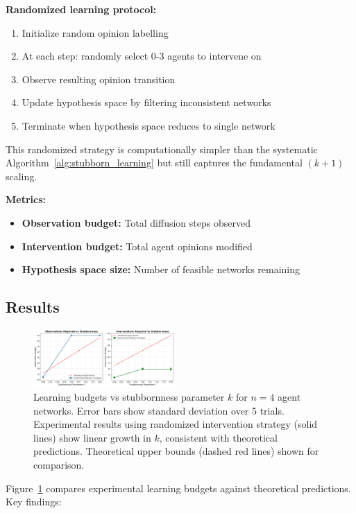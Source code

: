 \documentclass[conference]{IEEEtran}
\begin{document}
\textbf{Randomized learning protocol:} 
\begin{enumerate}
\item Initialize random opinion labelling
\item At each step: randomly select 0-3 agents to intervene on
\item Observe resulting opinion transition
\item Update hypothesis space by filtering inconsistent networks
\item Terminate when hypothesis space reduces to single network
\end{enumerate}

This randomized strategy is computationally simpler than the systematic Algorithm~\ref{alg:stubborn_learning} but still captures the fundamental $(k+1)$ scaling.

\textbf{Metrics:}
\begin{itemize}
\item \textbf{Observation budget:} Total diffusion steps observed
\item \textbf{Intervention budget:} Total agent opinions modified
\item \textbf{Hypothesis space size:} Number of feasible networks remaining
\end{itemize}

\subsection{Results}

\begin{figure}[t]
\centering
\includegraphics[width=0.48\textwidth]{learning_budgets_vs_stubbornness.png}
\caption{Learning budgets vs stubbornness parameter $k$ for $n=4$ agent networks. Error bars show standard deviation over 5 trials. Experimental results using randomized intervention strategy (solid lines) show linear growth in $k$, consistent with theoretical predictions. Theoretical upper bounds (dashed red lines) shown for comparison.}
\label{fig:budgets}
\end{figure}

Figure~\ref{fig:budgets} compares experimental learning budgets against theoretical predictions. Key findings:
\end{document}
